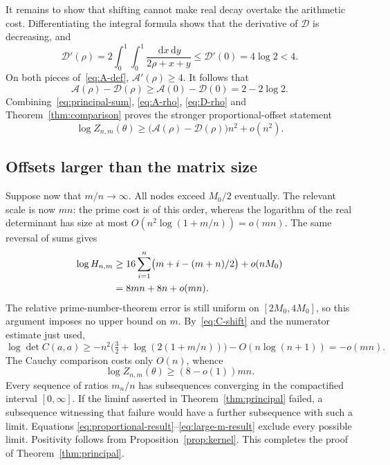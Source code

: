 \documentclass[11pt]{article}
\theoremstyle{definition}
\theoremstyle{remark}
\numberwithin{equation}{section}
\newcommand{\dd}{\,\mathrm d}
\begin{document}
It remains to show that shifting cannot make real decay overtake
the arithmetic cost. Differentiating the integral formula shows
that the derivative of $\mathcal D$ is decreasing, and
\begin{equation}\label{eq:D-derivative}
 \mathcal D'(\rho)=2\int_0^1\int_0^1
       \frac{\dd x\dd y}{2\rho+x+y}
 \leq\mathcal D'(0)=4\log2<4.
\end{equation}
On both pieces of~\eqref{eq:A-def}, $\mathcal A'(\rho)\geq4$.
It follows that
\begin{equation}\label{eq:A-minus-D}
 \mathcal A(\rho)-\mathcal D(\rho)
 \geq\mathcal A(0)-\mathcal D(0)=2-2\log2.
\end{equation}
Combining~\eqref{eq:principal-sum}, \eqref{eq:A-rho},
\eqref{eq:D-rho} and Theorem~\ref{thm:comparison} proves the stronger
proportional-offset statement
\begin{equation}\label{eq:proportional-result}
 \log Z_{n,m}(\theta)
 \geq\bigl(\mathcal A(\rho)-\mathcal D(\rho)\bigr)n^2+o(n^2).
\end{equation}

\subsection{Offsets larger than the matrix size}

Suppose now that $m/n\to\infty$. All nodes exceed $M_0/2$ eventually.
The relevant scale is now $mn$: the prime cost is of this order,
whereas the logarithm of the real determinant has size at most
$O(n^2\log(1+m/n))=o(mn)$.
The same reversal of sums gives
\begin{align}
 \log H_{n,m}
 &\geq16\sum_{i=1}^n\bigl(m+i-(m+n)/2\bigr)+o(nM_0)\notag\\
 &=8mn+8n+o(mn).\label{eq:large-m-arithmetic}
\end{align}
The relative prime-number-theorem error is still uniform on
$[2M_0,4M_0]$, so this argument imposes no upper bound on $m$.
By~\eqref{eq:C-shift} and the numerator estimate just used,
\begin{equation}\label{eq:large-m-real}
 \log\det C(a,a)
 \geq-n^2\bigl(\tfrac32+\log(2(1+m/n))\bigr)-O(n\log(n+1))
 =-o(mn).
\end{equation}
The Cauchy comparison costs only $O(n)$, whence
\begin{equation}\label{eq:large-m-result}
 \log Z_{n,m}(\theta)\geq(8-o(1))mn.
\end{equation}
Every sequence of ratios $m_n/n$ has subsequences converging in the
compactified interval $[0,\infty]$. If the liminf asserted in
Theorem~\ref{thm:principal} failed, a subsequence witnessing that failure
would have a further subsequence with such a limit. Equations
\eqref{eq:proportional-result}--\eqref{eq:large-m-result} exclude every
possible limit. Positivity follows from Proposition~\ref{prop:kernel}.
This completes the proof of Theorem~\ref{thm:principal}.
\end{document}
